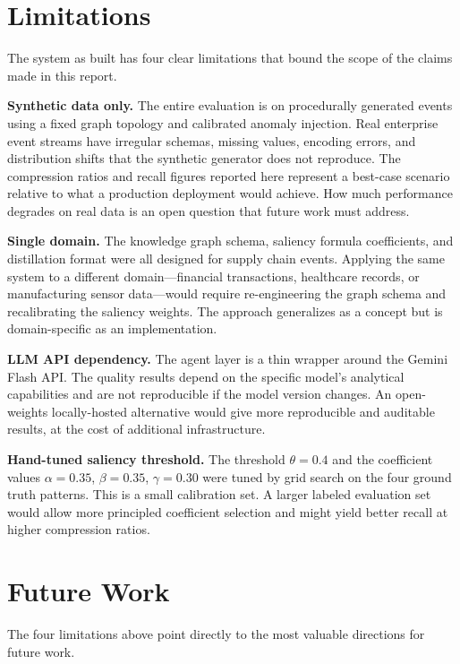 \section{Limitations}
\label{sec:limitations}

The system as built has four clear limitations that bound the scope of the claims made in
this report.

\textbf{Synthetic data only.} The entire evaluation is on procedurally generated events
using a fixed graph topology and calibrated anomaly injection. Real enterprise event streams
have irregular schemas, missing values, encoding errors, and distribution shifts that the
synthetic generator does not reproduce. The compression ratios and recall figures reported
here represent a best-case scenario relative to what a production deployment would achieve.
How much performance degrades on real data is an open question that future work must address.

\textbf{Single domain.} The knowledge graph schema, saliency formula coefficients, and
distillation format were all designed for supply chain events. Applying the same system to
a different domain---financial transactions, healthcare records, or manufacturing sensor
data---would require re-engineering the graph schema and recalibrating the saliency
weights. The approach generalizes as a concept but is domain-specific as an implementation.

\textbf{LLM API dependency.} The agent layer is a thin wrapper around the Gemini Flash
API. The quality results depend on the specific model's analytical capabilities and are
not reproducible if the model version changes. An open-weights locally-hosted alternative
would give more reproducible and auditable results, at the cost of additional infrastructure.

\textbf{Hand-tuned saliency threshold.} The threshold $\theta = 0.4$ and the coefficient
values $\alpha = 0.35$, $\beta = 0.35$, $\gamma = 0.30$ were tuned by grid search on the
four ground truth patterns. This is a small calibration set. A larger labeled evaluation
set would allow more principled coefficient selection and might yield better recall at
higher compression ratios.

\section{Future Work}
\label{sec:future_work}

The four limitations above point directly to the most valuable directions for future work.


